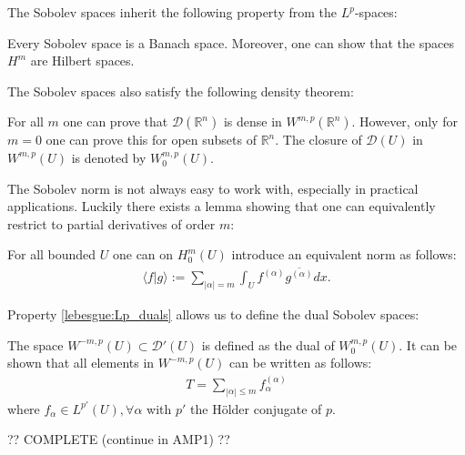 
    The Sobolev spaces inherit the following property from the $L^p$-spaces:
    \begin{property}
        Every Sobolev space is a Banach space. Moreover, one can show that the spaces $H^m$ are Hilbert spaces.
    \end{property}
    The Sobolev spaces also satisfy the following density theorem:
    \begin{property}
        For all $m$ one can prove that $\mathcal{D}(\mathbb{R}^n)$ is dense in $W^{m, p}(\mathbb{R}^n)$. However, only for $m=0$ one can prove this for open subsets of $\mathbb{R}^n$. The closure of $\mathcal{D}(U)$ in $W^{m, p}(U)$ is denoted by $W_0^{m, p}(U)$.
    \end{property}

    The Sobolev norm is not always easy to work with, especially in practical applications. Luckily there exists a lemma showing that one can equivalently restrict to partial derivatives of order $m$:
    \begin{theorem}[Friedrich]
        For all bounded $U$ one can on $H^m_0(U)$ introduce an equivalent norm as follows:
        \begin{gather}
            \langle f|g \rangle := \sum_{|\alpha|=m}\int_U f^{(\alpha)}\overline{g^{(\alpha)}}dx.
        \end{gather}
    \end{theorem}

    Property \ref{lebesgue:Lp_duals} allows us to define the dual Sobolev spaces:
    \begin{definition}
        The space $W^{-m, p}(U)\subset\mathcal{D}'(U)$ is defined as the dual of $W^{m, p}_0(U)$. It can be shown that all elements in $W^{-m, p}(U)$ can be written as follows:
        \begin{gather}
            T = \sum_{|\alpha|\leq m}f^{(\alpha)}_\alpha
        \end{gather}
        where $f_\alpha\in L^{p'}(U), \forall\alpha$ with $p'$ the H\"older conjugate of $p$.
    \end{definition}

    ?? COMPLETE (continue in AMP1) ??